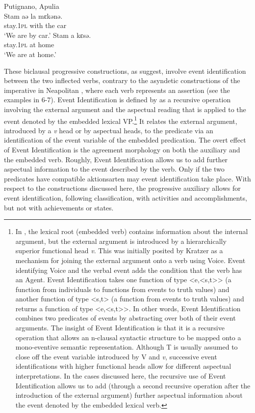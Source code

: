 \documentclass[output=paper]{langsci/langscibook}
\begin{document}
\ea%
    Putignano, Apulia\label{ex:lorusso:37}\\
    \ea
    \gll Stam    aə  la  mɛkənə.\\
         stay.\textsc{1pl}   with  the  car\\
    \glt ‘We are by car.’
    \ex
    \gll Stam     a   kɛsə.\\
         stay.\textsc{1pl}   at  home \\
    \glt ‘We are at home.’
    \z
\z

These biclausal progressive constructions, as \citet{Manzini2005} suggest, involve event identification between the two inflected verbs, contrary to the asyndetic constructions of the imperative in Neapolitan \citep{Ledgeway1997}, where each verb represents an assertion (see the examples in 6-7). Event Identification is defined by \citet{Kratzer1996} as a recursive operation involving the external argument and the aspectual reading that is applied to the event denoted by the embedded lexical VP.\footnote{In \citet{Kratzer1996}, the lexical root (embedded verb) contains information about the internal argument, but the external argument is introduced by a hierarchically superior functional head \textit{v}. This was initially posited by Kratzer as a mechanism for joining the external argument onto a verb using Voice. Event identifying Voice and the verbal event adds the condition that the verb has an Agent. Event Identification takes one function of type <e,<s,t{>}{>} (a function from individuals to functions from events to truth values) and another function of type <s,t> (a function from events to truth values) and returns a function of type <e,<s,t{>}{>}. In other words, Event Identification combines two predicates of events by abstracting over both of their event arguments. The insight of  Event Identification is that it is a recursive operation that allows an n-clausal syntactic structure to be mapped onto a mono-eventive semantic representation. Although T is usually assumed to close off the event variable introduced by V and \textit{v}, successive event identifications with higher functional heads allow for different aspectual interpretations. In the cases discussed here, the recursive use of Event Identification allows us to add (through a second recursive operation after the introduction of the external argument) further aspectual information about the event denoted by the embedded lexical verb.} It relates the external argument, introduced by a \textit{v} head or by aspectual heads, to the predicate via an identification of the event variable of the embedded predication. The overt effect of Event Identification is the agreement morphology on both the auxiliary and the embedded verb. Roughly, Event Identification allows us to add further aspectual information to the event described by the verb. Only if the two predicates have compatible aktionsarten may event identification take place. With respect to the constructions discussed here, the progressive auxiliary allows for event identification, following  classification, with activities and accomplishments, but not with achievements or states.
\end{document}
